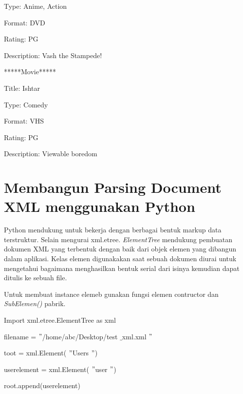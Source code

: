 \documentclass{wileySix}
\begin{document}
\begin{myEnumerate}
\begin{myEnumerate}
{\noindent 
Type: Anime, Action \par
\noindent 
Format: DVD \par
\noindent 
Rating: PG \par
\noindent 
Description: Vash the Stampede! \par
\noindent 
*****Movie***** \par
\noindent 
Title: Ishtar \par
\noindent 
Type: Comedy \par
\noindent 
Format: VHS \par
\noindent 
Rating: PG \par
\noindent 
Description: Viewable boredom \par
\vspace{12pt}
\noindent

\section{Membangun Parsing Document XML menggunakan Python}
\par
\noindent 
\hspace*{0.5in} Python mendukung untuk bekerja dengan berbagai bentuk markup data terstruktur. Selain mengurai xml.etree. \textit{ElementTree} mendukung pembuatan dokumen XML yang terbentuk dengan baik dari objek elemen yang dibangun dalam aplikasi. Kelas elemen digunakakan saat sebuah dokumen diurai untuk mengetahui bagaimana menghasilkan bentuk serial dari isinya kemudian dapat ditulis ke sebuah file.  \par
\vspace{12pt}
\noindent 
\hspace*{0.5in} Untuk membuat instance elemeb gunakan fungsi elemen contructor dan \textit{SubElemen()} pabrik. \par
\noindent 
Import xml.etree.ElementTree as xml \par
\vspace{12pt}
\noindent 
{\fontsize{10pt}{10pt}\selectfont filename =  $ " $/home/abc/Desktop/test $  \_  $xml.xml $ " $} \par
\noindent 
{\fontsize{10pt}{10pt}\selectfont toot = xml.Element( $ " $Users $ " $)} \par
\noindent 
{\fontsize{10pt}{10pt}\selectfont userelement = xml.Element( $ " $user $ " $)} \par
\noindent 
{\fontsize{10pt}{10pt}\selectfont root.append(userelement)} \par
\noindent 
\vspace{10pt}
}
\end{myEnumerate}
\end{myEnumerate}
\end{document}
